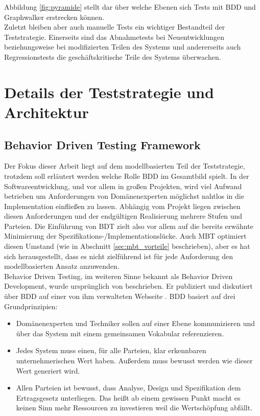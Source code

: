 Abbildung \ref{fig:pyramide} stellt dar über welche Ebenen sich Tests mit \Gls{BDD} und Graphwalker erstrecken können.\\
Zuletzt bleiben aber auch manuelle Tests ein wichtiger Bestandteil der Teststrategie. Einerseits sind das Abnahmetests bei Neuentwicklungen beziehungsweise bei modifizierten Teilen des Systems und andererseits auch Regressionstests die geschäftskritische Teile des Systems überwachen.

\section{Details der Teststrategie und Architektur}

\subsection{Behavior Driven Testing Framework}
\label{sec:bdd}
Der Fokus dieser Arbeit liegt auf dem modellbasierten Teil der Teststrategie, trotzdem soll erläutert werden welche Rolle \Gls{BDD} im Gesamtbild spielt. In der Softwareentwicklung, und vor allem in großen Projekten, wird viel Aufwand betrieben um Anforderungen von Domänenexperten möglichst nahtlos in die Implementation einfließen zu lassen. Abhängig vom Projekt liegen zwischen diesen Anforderungen und der endgültigen Realisierung mehrere Stufen und Parteien. Die Einführung von BDT zielt also vor allem auf die bereits erwähnte Minimierung der Spezifikations-/Implementationslücke. Auch \Gls{MBT} optimiert diesen Umstand (wie in Abschnitt \ref{sec:mbt_vorteile} beschrieben), aber es hat sich herausgestellt, dass es nicht zielführend ist für jede Anforderung den modellbasierten Ansatz anzuwenden.\\
Behavior Driven Testing, im weiteren Sinne bekannt als Behavior Driven Development, wurde ursprünglich von \citeauthor{north_official_2015} beschrieben. Er publiziert und diskutiert über \gls{BDD} auf einer von ihm verwalteten Webseite \cite{north_official_2015}. \gls{BDD} basiert auf drei Grundprinzipien:

\begin{itemize}
\item Domänenexperten und Techniker sollen auf einer Ebene kommunizieren und über das System mit einem gemeinsamen Vokabular referenzieren.
\item Jedes System muss einen, für alle Parteien, klar erkennbaren unternehmerischen Wert haben. Außerdem muss bewusst werden wie dieser Wert generiert wird.
\item Allen Parteien ist bewusst, dass Analyse, Design und Spezifikation dem Ertragsgesetz unterliegen. Das heißt ab einem gewissen Punkt macht es keinen Sinn mehr Ressourcen zu investieren weil die Wertschöpfung abfällt.
\end{itemize}


